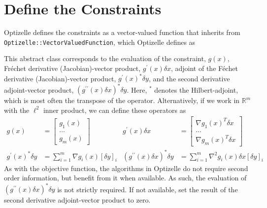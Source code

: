 \documentclass{report}
\newcommand{\re}{\mathbb{R}}
\begin{document}
\section{Define the Constraints}

        Optizelle defines the constraints as a vector-valued function that inherits from \texttt{Optizelle::VectorValuedFunction}, which Optizelle defines as

This abstract class corresponds to the evaluation of the constraint, $g(x)$, Fr\'{e}chet derivative (Jacobian)-vector product, $g^\prime(x)\delta x$, adjoint of the F\'{e}chet derivative (Jacobian)-vector product, $g^\prime(x)^*\delta y$, and the second derivative adjoint-vector product, $(g^{\prime\prime}(x)\delta x)^*\delta y$.  Here, $^*$ denotes the Hilbert-adjoint, which is most often the transpose of the operator.  Alternatively, if we work in $\re^m$ with the $\ell^2$ inner product, we can define these operators as
\begin{align*}
        g(x)&=\begin{bmatrix}
            g_1(x)\\
            \dots\\
            g_m(x)
        \end{bmatrix}
        & g^\prime(x)\delta x&=\begin{bmatrix}
                \nabla g_1(x)^T \delta x\\
                \dots\\
                \nabla g_m(x)^T \delta x
        \end{bmatrix}\\
        g^\prime(x)^*\delta y&=
        \sum\limits_{i=1}^m \nabla g_i(x) [\delta y]_i 
        & (g^{\prime\prime}(x)\delta x)^*\delta y&=
        \sum\limits_{i=1}^m \nabla^2 g_i(x)\delta x [\delta y]_i 
\end{align*}
As with the objective function, the algorithms in Optizelle do not require second order information, but benefit from it when available.  As such, the evaluation of $(g^{\prime\prime}(x)\delta x)^*\delta y$ is not strictly required.  If not available, set the result of the second derivative adjoint-vector product to zero.
\end{document}

